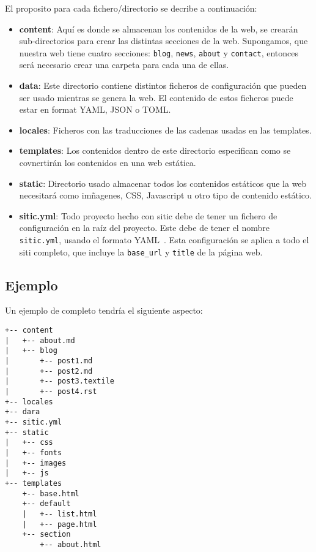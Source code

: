 El proposito para cada fichero/directorio se decribe a continuación:

\begin{itemize}
    \item \textbf{content}: Aquí es donde se almacenan los contenidos de la web, se crearán
        sub-directorios para crear las distintas secciones de la web. Supongamos, que nuestra web
        tiene cuatro secciones: \texttt{blog}, \texttt{news}, \texttt{about} y \texttt{contact},
        entonces será necesario crear una carpeta para cada una de ellas.
    \item \textbf{data}: Este directorio contiene distintos ficheros de configuración que pueden
        ser usado mientras se genera la web. El contenido de estos ficheros puede estar en format
        YAML, JSON o TOML.
    \item \textbf{locales}: Ficheros con las traducciones de las cadenas usadas en las templates.
    \item \textbf{templates}: Los contenidos dentro de este directorio especifican como se covnertirán
        los contenidos en una web estática.
    \item \textbf{static}: Directorio usado almacenar todos los contenidos estáticos que la web
        necesitará como imñagenes, CSS, Javascript u otro tipo de contenido estático.
    \item \textbf{sitic.yml}: Todo proyecto hecho con sitic debe de tener un fichero
        de configuración en la raíz del proyecto. Este debe de tener el nombre \texttt{sitic.yml},
        usando el formato YAML~\cite{yaml}. Esta configuración se aplica a todo el siti completo,
        que incluye la \texttt{base\_url} y \texttt{title} de la página web.
\end{itemize}

\subsection{Ejemplo}
Un ejemplo de completo tendría el siguiente aspecto:

\begin{verbatim}
+-- content
|   +-- about.md
|   +-- blog
|       +-- post1.md
|       +-- post2.md
|       +-- post3.textile
|       +-- post4.rst
+-- locales
+-- dara
+-- sitic.yml
+-- static
|   +-- css
|   +-- fonts
|   +-- images
|   +-- js
+-- templates
    +-- base.html
    +-- default
    |   +-- list.html
    |   +-- page.html
    +-- section
        +-- about.html
\end{verbatim}

